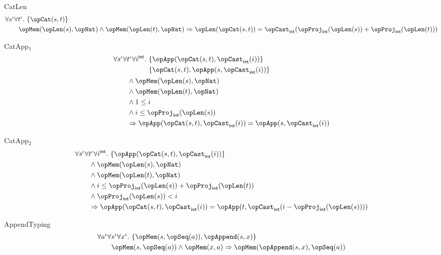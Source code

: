 \documentclass[11pt, a4paper, oneside]{article}
\begin{document}
\begin{axioms}
\item[CatLen] \[
        \begin{aligned}
            &\forall s^\idv \forall t^\idv.\, \st{ \opCat(s, t) } \\
            &\qquad \opMem(\opLen(s), \opNat) \wedge \opMem(\opLen(t), \opNat) \imp \opLen(\opCat(s, t)) = \opCast_\int(\opProj_\int(\opLen(s)) + \opProj_\int(\opLen(t)))
        \end{aligned}
    \]

\item[CatApp$_1$] \[
        \begin{aligned}
            &\forall s^\idv \forall t^\idv \forall i^\int.\, \begin{aligned}[t]
                &\st{ \opApp(\opCat(s, t), \opCast_\int(i)) } \\
                &\st{ \opCat(s, t), \opApp(s, \opCast_\int(i)) }
            \end{aligned} \\
            &\qquad \wedge \opMem(\opLen(s), \opNat) \\
            &\qquad \wedge \opMem(\opLen(t), \opNat) \\
            &\qquad \wedge 1 \le i \\
            &\qquad \wedge i \le \opProj_\int(\opLen(s)) \\
            &\qquad \imp \opApp(\opCat(s, t), \opCast_\int(i)) = \opApp(s, \opCast_\int(i))
        \end{aligned}
    \]

\item[CatApp$_2$] \[
        \begin{aligned}
            &\forall s^\idv \forall t^\idv \forall i^\int.\, \st{ \opApp(\opCat(s, t), \opCast_\int(i)) } \\
            &\qquad \wedge \opMem(\opLen(s), \opNat) \\
            &\qquad \wedge \opMem(\opLen(t), \opNat) \\
            &\qquad \wedge i \le \opProj_\int(\opLen(s)) + \opProj_\int(\opLen(t)) \\
            &\qquad \wedge \opProj_\int(\opLen(s)) < i \\
            &\qquad \imp \opApp(\opCat(s, t), \opCast_\int(i)) = \opApp(t, \opCast_\int(i - \opProj_\int(\opLen(s))))
        \end{aligned}
    \]

\item[AppendTyping] \[
        \begin{aligned}
            &\forall a^\idv \forall s^\idv \forall x^\idv.\, \st{ \opMem(s, \opSeq(a)), \opAppend(s, x) } \\
            &\qquad \opMem(s, \opSeq(a)) \wedge \opMem(x, a) \imp \opMem(\opAppend(s, x), \opSeq(a))
        \end{aligned}
    \]


\end{axioms}
\end{document}
